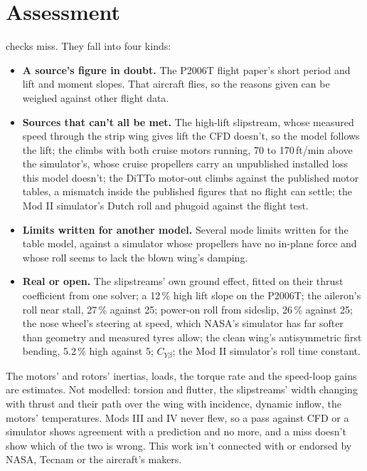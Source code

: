 \documentclass[10pt,a4paper,twocolumn]{article}
\begin{document}
\section{Assessment}\label{sec:assess}
\Nmiss{} checks miss. They fall into four kinds:
\begin{itemize}
\item \textbf{A source's figure in doubt.} The P2006T flight paper's short period and lift and moment slopes. That aircraft flies, so the reasons given can be weighed against other flight data.
\item \textbf{Sources that can't all be met.} The high-lift slipstream, whose measured speed through the strip wing gives lift the CFD doesn't, so the model follows the lift; the climbs with both cruise motors running, 70 to 170\,ft/min above the simulator's, whose cruise propellers carry an unpublished installed loss this model doesn't; the DiTTo motor-out climbs against the published motor tables, a mismatch inside the published figures that no flight can settle; the Mod II simulator's Dutch roll and phugoid against the flight test.
\item \textbf{Limits written for another model.} Several mode limits written for the table model, against a simulator whose propellers have no in-plane force and whose roll seems to lack the blown wing's damping.
\item \textbf{Real or open.} The slipstreams' own ground effect, fitted on their thrust coefficient from one solver; a 12\,\% high lift slope on the P2006T; the aileron's roll near stall, 27\,\% against 25; power-on roll from sideslip, 26\,\% against 25; the nose wheel's steering at speed, which NASA's simulator has far softer than geometry and measured tyres allow; the clean wing's antisymmetric first bending, 5.2\,\% high against 5; $C_{Y\beta}$; the Mod II simulator's roll time constant.
\end{itemize}
The motors' and rotors' inertias, loads, the torque rate and the speed-loop gains are estimates. Not modelled: torsion and flutter, the slipstreams' width changing with thrust and their path over the wing with incidence, dynamic inflow, the motors' temperatures. Mods III and IV never flew, so a pass against CFD or a simulator shows agreement with a prediction and no more, and a miss doesn't show which of the two is wrong. This work isn't connected with or endorsed by NASA, Tecnam or the aircraft's makers.
\end{document}
